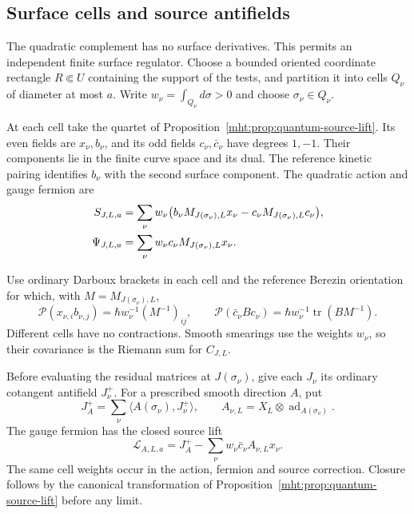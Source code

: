 \subsection{Surface cells and source antifields}

The quadratic complement has no surface derivatives. This permits
an independent finite surface regulator. Choose a bounded oriented
coordinate rectangle $R\Subset U$ containing the support of the
tests, and partition it into cells $Q_\nu$ of diameter at most $a$.
Write $w_\nu=\int_{Q_\nu}d\sigma>0$ and choose
$\sigma_\nu\in Q_\nu$.

At each cell take the quartet of
Proposition~\ref{mht:prop:quantum-source-lift}. Its even fields are
$x_\nu,b_\nu$, and its odd fields $c_\nu,\bar c_\nu$ have degrees
$1,-1$. Their components
lie in the finite curve space and its dual. The reference kinetic
pairing identifies $b_\nu$ with the second surface component.
The quadratic action and gauge fermion are
\begin{align}
 S_{J,L,a}&=\sum_\nu w_\nu
       \bigl(b_\nu M_{J(\sigma_\nu),L}x_\nu
             -\bar c_\nu M_{J(\sigma_\nu),L}c_\nu\bigr),\notag\\
 \Psi_{J,L,a}&=\sum_\nu w_\nu
                \bar c_\nu M_{J(\sigma_\nu),L}x_\nu.
 \label{mht:eq:surface-quartet-regulator}
\end{align}

Use ordinary Darboux brackets in each cell and the reference
Berezin orientation for which, with $M=M_{J(\sigma_\nu),L}$,
\[
 \mathcal P(x_{\nu,i}b_{\nu,j})
       =\hbar w_\nu^{-1}(M^{-1})_{ij},\qquad
 \mathcal P(\bar c_\nu Bc_\nu)
       =\hbar w_\nu^{-1}\operatorname{tr}(BM^{-1}).
\]
Different cells have no contractions. Smooth smearings use the
weights $w_\nu$, so their covariance is the Riemann sum for
$C_{J,L}$.

Before evaluating the residual matrices at $J(\sigma_\nu)$,
give each $J_\nu$ its ordinary cotangent antifield $J_\nu^+$.
For a prescribed smooth direction $A$, put
\[
 J_A^+=\sum_\nu\langle A(\sigma_\nu),J_\nu^+\rangle,
 \qquad A_{\nu,L}=X_L\otimes\operatorname{ad}_{A(\sigma_\nu)}.
\]
The gauge fermion has the closed source lift
\begin{equation}\label{mht:eq:surface-quartet-source}
 \mathcal L_{A,L,a}=J_A^+
       -\sum_\nu w_\nu\bar c_\nu A_{\nu,L}x_\nu.
\end{equation}
The same cell weights occur in the action, fermion and source
correction. Closure follows by the canonical transformation of
Proposition~\ref{mht:prop:quantum-source-lift} before any limit.

